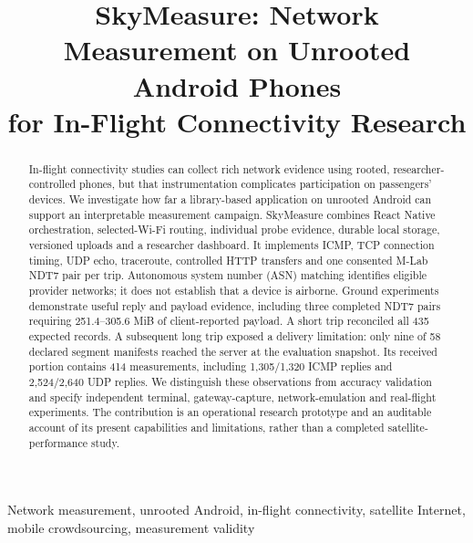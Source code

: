 \documentclass[10pt,conference]{IEEEtran}
\title{SkyMeasure: Network Measurement on Unrooted Android Phones\protect\\for In-Flight Connectivity Research}
\author{\IEEEauthorblockN{Hailemariam Mersha}
\IEEEauthorblockA{Computer Science, New York University Abu Dhabi\\
CS-UH 4001 Capstone Research Report\\
Evidence through 16 November 2026}}
\begin{document}
\pagestyle{plain}
\maketitle
\thispagestyle{plain}
\begin{abstract}
In-flight connectivity studies can collect rich network evidence using rooted,
researcher-controlled phones, but that instrumentation complicates participation
on passengers' devices. We investigate how far a library-based application on
unrooted Android can support an interpretable measurement campaign. SkyMeasure
combines React Native orchestration, selected-Wi-Fi routing, individual probe
evidence, durable local storage, versioned uploads and a researcher dashboard.
It implements ICMP, TCP connection timing, UDP echo, traceroute, controlled HTTP
transfers and one consented M-Lab NDT7 pair per trip. Autonomous system number (ASN) matching identifies
eligible provider networks; it does not establish that a device is airborne.
Ground experiments demonstrate useful reply and payload evidence, including
three completed NDT7 pairs requiring 251.4--305.6 MiB of client-reported payload.
A short trip reconciled all 435 expected records. A subsequent long trip exposed
a delivery limitation: only nine of 58 declared segment manifests reached the
server at the evaluation snapshot. Its received portion contains 414 measurements,
including 1,305/1,320 ICMP replies and 2,524/2,640 UDP replies. We distinguish these
observations from accuracy validation and specify independent terminal,
gateway-capture, network-emulation and real-flight experiments. The contribution
is an operational research prototype and an auditable account of its present
capabilities and limitations, rather than a completed satellite-performance study.
\end{abstract}
\begin{IEEEkeywords}
Network measurement, unrooted Android, in-flight connectivity, satellite Internet,
mobile crowdsourcing, measurement validity
\end{IEEEkeywords}


\clearpage
\balance


\clearpage
\onecolumn
\appendices

\end{document}
